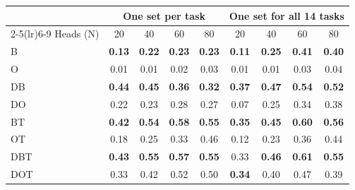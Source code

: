 \begin{tabular}{@{}lcccccccc@{}}
\toprule
 & \multicolumn{4}{c}{One set per task} & \multicolumn{4}{c}{One set for all 14 tasks} \\
\cmidrule(lr){2-5}\cmidrule(lr){6-9}
Heads (N) & 20 & 40 & 60 & 80 & 20 & 40 & 60 & 80 \\
\midrule
B & \textbf{0.13} & \textbf{0.22} & \textbf{0.23} & \textbf{0.23} & \textbf{0.11} & \textbf{0.25} & \textbf{0.41} & \textbf{0.40} \\
O & 0.01 & 0.01 & 0.02 & 0.03 & 0.01 & 0.01 & 0.03 & 0.04 \\
\addlinespace
DB & \textbf{0.44} & \textbf{0.45} & \textbf{0.36} & \textbf{0.32} & \textbf{0.37} & \textbf{0.47} & \textbf{0.54} & \textbf{0.52} \\
DO & 0.22 & 0.23 & 0.28 & 0.27 & 0.07 & 0.25 & 0.34 & 0.38 \\
\addlinespace
BT & \textbf{0.42} & \textbf{0.54} & \textbf{0.58} & \textbf{0.55} & \textbf{0.35} & \textbf{0.45} & \textbf{0.60} & \textbf{0.56} \\
OT & 0.18 & 0.25 & 0.33 & 0.46 & 0.12 & 0.23 & 0.36 & 0.44 \\
\addlinespace
DBT & \textbf{0.43} & \textbf{0.55} & \textbf{0.57} & \textbf{0.55} & 0.33 & \textbf{0.46} & \textbf{0.61} & \textbf{0.55} \\
DOT & 0.33 & 0.42 & 0.52 & 0.50 & \textbf{0.34} & 0.40 & 0.47 & 0.39 \\
\bottomrule
\end{tabular}
